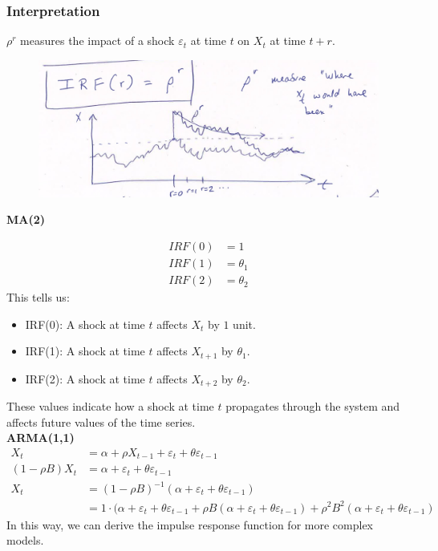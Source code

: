 \subsubsection{Interpretation}

$\rho^r$ measures the impact of a shock $\varepsilon_t$ at time $t$ on $X_t$ at time $t+r$.

\begin{figure}[H]
    \centering
    \includegraphics[width=0.75\linewidth]{images/Screenshot 2024-05-21 at 18.16.58.jpg}
\end{figure}

\textbf{MA(2)}

\begin{align*}
    IRF(0) &= 1 \\
    IRF(1)&=\theta_1\\
    IRF(2)&=\theta_2
    \end{align*}
    This tells us:
\begin{itemize}
    \item IRF(0): A shock at time $t$ affects $X_t$ by $1$ unit.
    \item IRF(1): A shock at time $t$ affects $X_{t+1}$ by $\theta_1$.
    \item IRF(2): A shock at time $t$ affects $X_{t+2}$ by $\theta_2$.
\end{itemize}
These values indicate how a shock at time $t$ propagates through the system and affects future values of the time series. \\


\textbf{ARMA(1,1)} \\

\begin{align*}
    X_t &= \alpha + \rho X_{t-1} + \varepsilon_t + \theta \varepsilon_{t-1} \\
    (1-\rho B)X_t &= \alpha + \varepsilon_t + \theta \varepsilon_{t-1} \\
    X_t &= (1-\rho B)^{-1} (\alpha + \varepsilon_t + \theta \varepsilon_{t-1}) \\
&= 1\cdot (\alpha + \varepsilon_t + \theta \varepsilon_{t-1} + \rho B (\alpha + \varepsilon_t + \theta \varepsilon_{t-1}) + \rho^2 B^2(\alpha + \varepsilon_t + \theta\varepsilon_{t-1})
\end{align*}
In this way, we can derive the impulse response function for more complex models.

